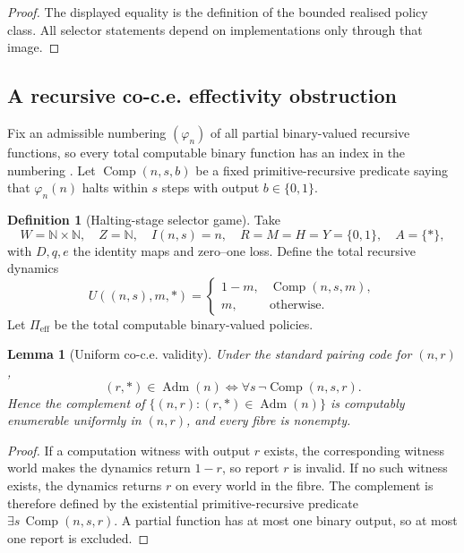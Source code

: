 \documentclass[11pt]{article}
\theoremstyle{plain}
\newtheorem{lemma}[theorem]{Lemma}
\theoremstyle{definition}
\newtheorem{definition}[theorem]{Definition}
\theoremstyle{remark}
\newcommand{\N}{\mathbb{N}}
\newcommand{\Adm}{\operatorname{Adm}}
\begin{document}
\begin{proof}
The displayed equality is the definition of the bounded realised policy class.
All selector statements depend on implementations only through that image.
\end{proof}

\subsection{A recursive co-c.e. effectivity obstruction}

Fix an admissible numbering $(\varphi_n)$ of all partial binary-valued recursive
functions, so every total computable binary function has an index in the
numbering \cite{rogers}. Let $\operatorname{Comp}(n,s,b)$ be a fixed
primitive-recursive predicate saying that $\varphi_n(n)$ halts within $s$ steps
with output $b\in\{0,1\}$.

\begin{definition}[Halting-stage selector game]\label{def:Kgame}
Take
\[
W=\N\times\N,\quad Z=\N,\quad I(n,s)=n,
\quad R=M=H=Y=\{0,1\},\quad A=\{\ast\},
\]
with $D,q,e$ the identity maps and zero--one loss. Define the total recursive
dynamics
\[
U((n,s),m,\ast)=
\begin{cases}
1-m,&\operatorname{Comp}(n,s,m),\\
m,&\text{otherwise}.
\end{cases}
\]
Let $\Pi_{\mathrm{eff}}$ be the total computable binary-valued policies.
\end{definition}

\begin{lemma}[Uniform co-c.e. validity]\label{lem:Kfibres}
Under the standard pairing code for $(n,r)$,
\[
(r,\ast)\in\Adm(n)
\iff
\forall s\,\neg\operatorname{Comp}(n,s,r).
\]
Hence the complement of
$\{(n,r):(r,\ast)\in\Adm(n)\}$ is computably enumerable uniformly in
$(n,r)$, and every fibre is nonempty.
\end{lemma}

\begin{proof}
If a computation witness with output $r$ exists, the corresponding witness world
makes the dynamics return $1-r$, so report $r$ is invalid. If no such witness
exists, the dynamics returns $r$ on every world in the fibre. The complement is
therefore defined by the existential primitive-recursive predicate
$\exists s\,\operatorname{Comp}(n,s,r)$. A partial function has at most one
binary output, so at most one report is excluded.
\end{proof}
\end{document}
